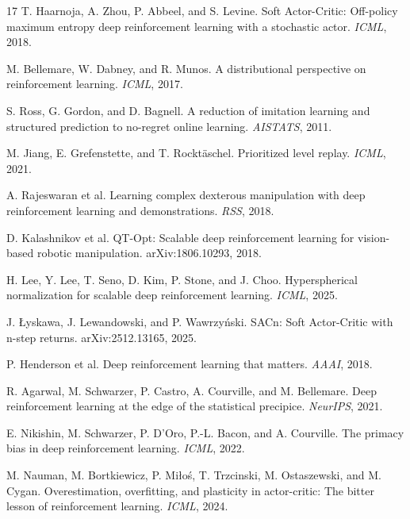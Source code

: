 \documentclass[10pt,twocolumn]{article}
\begin{document}
\fi
\begin{thebibliography}{17}
T. Haarnoja, A. Zhou, P. Abbeel, and S. Levine.
\newblock Soft Actor-Critic: Off-policy maximum entropy deep reinforcement learning with a stochastic actor.
\newblock \emph{ICML}, 2018.

M. Bellemare, W. Dabney, and R. Munos.
\newblock A distributional perspective on reinforcement learning.
\newblock \emph{ICML}, 2017.

S. Ross, G. Gordon, and D. Bagnell.
\newblock A reduction of imitation learning and structured prediction to no-regret online learning.
\newblock \emph{AISTATS}, 2011.

M. Jiang, E. Grefenstette, and T. Rockt\"{a}schel.
\newblock Prioritized level replay.
\newblock \emph{ICML}, 2021.

A. Rajeswaran et al.
\newblock Learning complex dexterous manipulation with deep reinforcement learning and demonstrations.
\newblock \emph{RSS}, 2018.

D. Kalashnikov et al.
\newblock QT-Opt: Scalable deep reinforcement learning for vision-based robotic manipulation.
\newblock arXiv:1806.10293, 2018.

H. Lee, Y. Lee, T. Seno, D. Kim, P. Stone, and J. Choo.
\newblock Hyperspherical normalization for scalable deep reinforcement learning.
\newblock \emph{ICML}, 2025.

J. {\L}yskawa, J. Lewandowski, and P. Wawrzy{\'n}ski.
\newblock SACn: Soft Actor-Critic with n-step returns.
\newblock arXiv:2512.13165, 2025.

P. Henderson et al.
\newblock Deep reinforcement learning that matters.
\newblock \emph{AAAI}, 2018.

R. Agarwal, M. Schwarzer, P. Castro, A. Courville, and M. Bellemare.
\newblock Deep reinforcement learning at the edge of the statistical precipice.
\newblock \emph{NeurIPS}, 2021.

E. Nikishin, M. Schwarzer, P. D'Oro, P.-L. Bacon, and A. Courville.
\newblock The primacy bias in deep reinforcement learning.
\newblock \emph{ICML}, 2022.

M. Nauman, M. Bortkiewicz, P. Mi\l{}o\'s, T. Trzcinski,
M. Ostaszewski, and M. Cygan.
\newblock Overestimation, overfitting, and plasticity in actor-critic: The bitter lesson of reinforcement learning.
\newblock \emph{ICML}, 2024.


\end{thebibliography}
\end{document}
